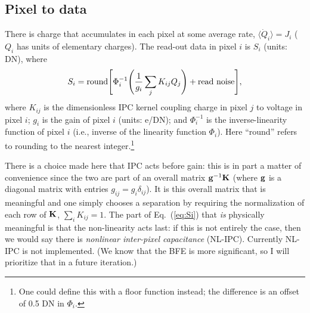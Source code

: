 \documentclass[prd,onecolumn,nofootinbib,nobibnotes]{revtex4}
\begin{document}
\subsection{Pixel to data}

There is charge that accumulates in each pixel at some average rate, $\langle \dot Q_i\rangle = J_i$ ($Q_i$ has units of elementary charges). The read-out data in pixel $i$ is $S_i$ (units: DN), where
\begin{equation}
S_i  = {\rm round} \Biggl[ \Phi_i^{-1} \Biggl( \frac1{g_i} \sum_j K_{ij}Q_j \Biggr) + {\rm read~noise} \Biggr],
\label{eq:Si}
\end{equation}
where $K_{ij}$ is the dimensionless IPC kernel coupling charge in pixel $j$ to voltage in pixel $i$; $g_i$ is the gain of pixel $i$ (units: e/DN); and $\Phi^{-1}_i$ is the inverse-linearity function of pixel $i$ (i.e., inverse of the linearity function $\Phi_i$). Here ``round'' refers to rounding to the nearest integer.\footnote{One could define this with a floor function instead; the difference is an offset of 0.5 DN in $\Phi_i$.}

There is a choice made here that IPC acts before gain: this is in part a matter of convenience since the two are part of an overall matrix ${\bf g}^{-1}{\bf K}$ (where ${\bf g}$ is a diagonal matrix with entries $g_{ij}=g_i\delta_{ij}$). It is this overall matrix that is meaningful and one simply chooses a separation by requiring the normalization of each row of ${\bf K}$, $\sum_i K_{ij}=1$. The part of Eq.~(\ref{eq:Si}) that {\em is} physically meaningful is that the non-linearity acts last: if this is not entirely the case, then we would say there is {\em nonlinear inter-pixel capacitance} (NL-IPC). Currently NL-IPC is not implemented. (We know that the BFE is more significant, so I will prioritize that in a future iteration.)
\end{document}
